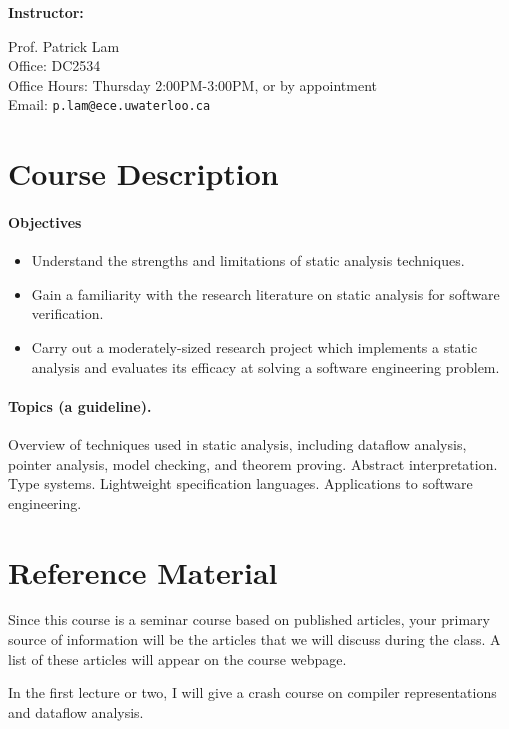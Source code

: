 \documentclass{article}
\begin{document}
\noindent
{\bf Instructor:} \\

\noindent
\hspace*{2em} \begin{minipage}{.6\textwidth}
Prof. Patrick Lam\\
Office: DC2534\\
Office Hours: Thursday 2:00PM-3:00PM, or by appointment\\
Email: {\tt p.lam@ece.uwaterloo.ca}\\
\end{minipage}

\section*{Course Description}
\paragraph{Objectives}
\begin{itemize}
\item Understand the strengths and limitations of static analysis techniques.
\item Gain a familiarity with the research literature on static analysis for software verification.
\item Carry out a moderately-sized research project which implements a static
analysis and evaluates its efficacy at solving a software engineering problem.
\end{itemize}

\paragraph{Topics (a guideline).}
Overview of techniques used in static analysis, including dataflow
analysis, pointer analysis, model checking, and theorem
proving. Abstract interpretation. Type systems. Lightweight
specification languages. Applications to software engineering.

\section*{Reference Material}
Since this course is a seminar course based on published articles, your
primary source of information will be the articles that we will discuss
during the class. A list of these articles will appear on the course
webpage.

In the first lecture or two, I will give a crash course on compiler
representations and dataflow analysis.
\end{document}
